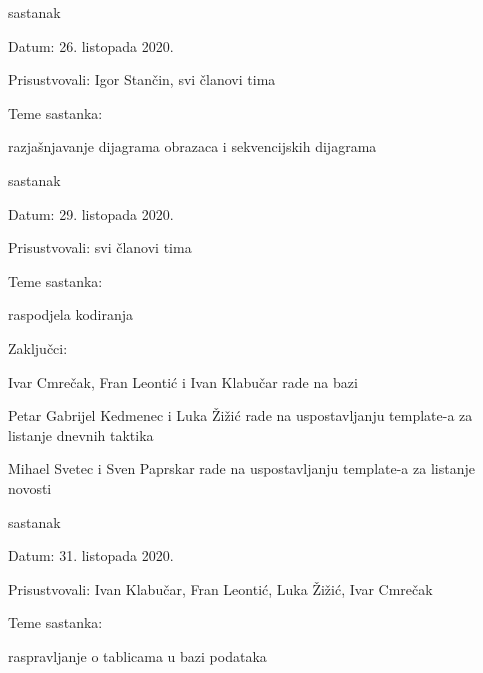 \begin{packed_enum}
			\item  sastanak
			\item[] \begin{packed_item}
				\item Datum: 26. listopada 2020. 
				\item Prisustvovali: Igor Stančin, svi članovi tima
				\item Teme sastanka:
				\begin{packed_item}
					\item  razjašnjavanje dijagrama obrazaca i sekvencijskih dijagrama
				\end{packed_item}
			\end{packed_item}
			
			\item  sastanak
			\item[] \begin{packed_item}
				\item Datum: 29. listopada 2020. 
				\item Prisustvovali: svi članovi tima
				\item Teme sastanka:
				\begin{packed_item}
					\item  raspodjela kodiranja
				\end{packed_item}
				\item Zaključci:
				\begin{packed_item}
					\item Ivar Cmrečak, Fran Leontić i Ivan Klabučar rade na bazi
					\item Petar Gabrijel Kedmenec i Luka Žižić rade na uspostavljanju template-a za listanje dnevnih taktika
					\item Mihael Svetec i Sven Paprskar rade na uspostavljanju template-a za listanje novosti
				\end{packed_item}
			\end{packed_item}
		
			\item  sastanak
			\item[] \begin{packed_item}
				\item Datum: 31. listopada 2020. 
				\item Prisustvovali: Ivan Klabučar, Fran Leontić, Luka Žižić, Ivar Cmrečak
				\item Teme sastanka:
				\begin{packed_item}
					\item  raspravljanje o tablicama u bazi podataka
				\end{packed_item}
			\end{packed_item}
		

\end{packed_enum}
